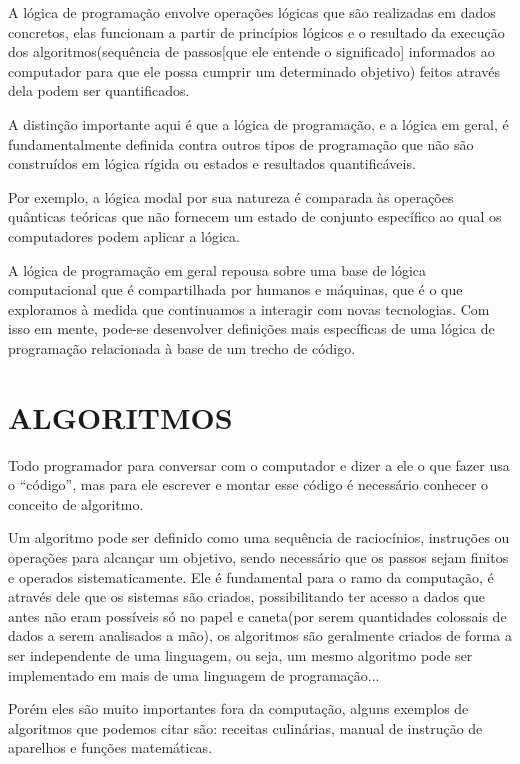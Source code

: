 A lógica de programação envolve operações lógicas que são realizadas em dados concretos, elas funcionam a partir de princípios lógicos e o resultado da execução dos algoritmos(sequência de passos[que ele entende o significado] informados ao computador para que ele possa cumprir um determinado objetivo) feitos através dela podem ser quantificados. 

A distinção importante aqui é que a lógica de programação, e a lógica em geral, é fundamentalmente definida contra outros tipos de programação que não são construídos em lógica rígida ou estados e resultados quantificáveis. 

Por exemplo, a lógica modal por sua natureza é comparada às operações quânticas teóricas que não fornecem um estado de conjunto específico ao qual os computadores podem aplicar a lógica. 

A lógica de programação em geral repousa sobre uma base de lógica computacional que é compartilhada por humanos e máquinas, que é o que exploramos à medida que continuamos a interagir com novas tecnologias. Com isso em mente, pode-se desenvolver definições mais específicas de uma lógica de programação relacionada à base de um trecho de código. 

\section{ALGORITMOS}
\label{sec:ALGORITMOS}

Todo programador para conversar com o computador e dizer a ele o que fazer usa o “código”, mas para ele escrever e montar esse código é necessário conhecer o conceito de algoritmo.  

Um algoritmo pode ser definido como uma sequência de raciocínios, instruções ou operações para alcançar um objetivo, sendo necessário que os passos sejam finitos e operados sistematicamente. 
Ele é fundamental para o ramo da computação, é através dele que os sistemas são criados, possibilitando ter acesso a dados que antes não eram possíveis só no papel e caneta(por serem quantidades colossais de dados a serem analisados a mão), os algoritmos são geralmente criados de forma a ser independente de uma linguagem, ou seja, um mesmo algoritmo pode ser implementado em mais de uma linguagem de programação... 

Porém eles são muito importantes fora da computação, alguns exemplos de algoritmos que podemos citar são: receitas culinárias, manual de instrução de aparelhos e funções matemáticas. 

